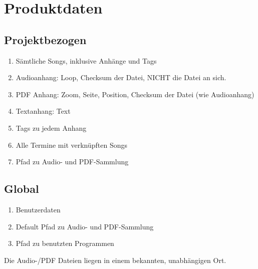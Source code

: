 
\section{Produktdaten}

\subsection{Projektbezogen}
\begin{enumerate}[{/PD}1{/}]
\item Sämtliche Songs, inklusive Anhänge und Tags
\item Audioanhang: Loop, Checksum der Datei, NICHT die Datei an sich.
\item PDF Anhang: Zoom, Seite, Position, Checksum der Datei (wie Audioanhang)
\item Textanhang: Text
\item Tags zu jedem Anhang
\item Alle Termine mit verknüpften Songs
\item Pfad zu Audio- und PDF-Sammlung
\end{enumerate}

\subsection{Global}
\begin{enumerate}[{/PD}1{/}]
\item Benutzerdaten
\item Default Pfad zu Audio- und PDF-Sammlung
\item Pfad zu benutzten Programmen
\end{enumerate}

Die Audio-/PDF Dateien liegen in einem bekannten, unabhängigen Ort.

